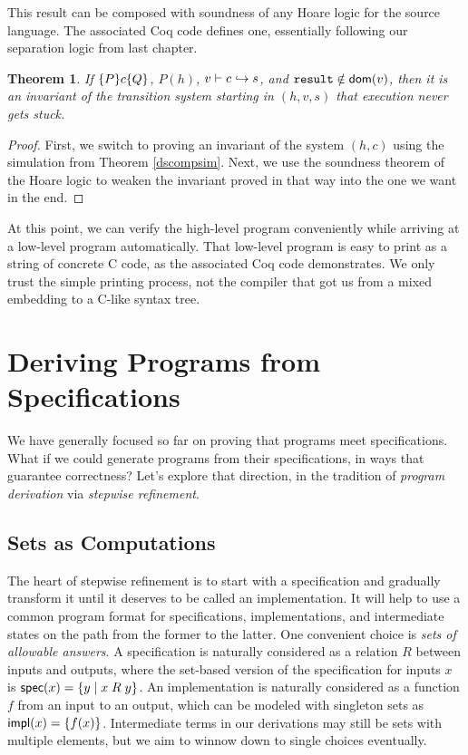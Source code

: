 \documentclass{amsbook}
\newtheorem{theorem}{Theorem}[chapter]
\theoremstyle{definition}
\theoremstyle{remark}
\numberwithin{section}{chapter}
\numberwithin{equation}{chapter}
\begin{document}
This result can be composed with soundness of any Hoare logic for the source language.
The associated Coq code defines one, essentially following our separation logic from last chapter.

\begin{theorem}
  If $\{P\} c \{Q\}$, $P(h)$, $v \vdash c \hookrightarrow s$, and $\texttt{result} \notin \mathsf{dom}(v)$, then it is an invariant of the transition system starting in $(h, v, s)$ that execution never gets stuck.
\end{theorem}
\begin{proof}
  First, we switch to proving an invariant of the system $(h, c)$ using the simulation from Theorem \ref{dscompsim}.
  Next, we use the soundness theorem of the Hoare logic to weaken the invariant proved in that way into the one we want in the end.
\end{proof}

At this point, we can verify the high-level program conveniently while arriving at a low-level program automatically.
That low-level program is easy to print as a string of concrete C code, as the associated Coq code demonstrates.
We only trust the simple printing process, not the compiler that got us from a mixed embedding to a C-like syntax tree.



\chapter{Deriving Programs from Specifications}\label{deriving}

We have generally focused so far on proving that programs meet specifications.
What if we could generate programs from their specifications, in ways that guarantee correctness?
Let's explore that direction, in the tradition of \emph{program derivation} via \emph{stepwise refinement}.

\section{Sets as Computations}

The heart of stepwise refinement is to start with a specification and gradually transform it until it deserves to be called an implementation.
It will help to use a common program format for specifications, implementations, and intermediate states on the path from the former to the latter.
One convenient choice is \emph{sets of allowable answers}.
A specification is naturally considered as a relation $R$ between inputs and outputs, where the set-based version of the specification for inputs $x$ is $\mathsf{spec}(x) = \{y \mid x \; R \; y\}$.
An implementation is naturally considered as a function $f$ from an input to an output, which can be modeled with singleton sets as $\mathsf{impl}(x) = \{f(x)\}$.
Intermediate terms in our derivations may still be sets with multiple elements, but we aim to winnow down to single choices eventually.
\end{document}
